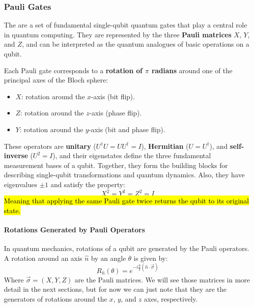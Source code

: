 \subsubsection{Pauli Gates}\label{sec:pauli-gates}

The  are a set of fundamental single-qubit quantum gates that play a central role in quantum computing. They are represented by the three \textbf{Pauli matrices} $X$, $Y$, and $Z$, and can be interpreted as the quantum analogues of basic operations on a qubit.

\highspace
Each Pauli gate corresponds to a \textbf{rotation of $\pi$ radians} around one of the principal axes of the Bloch sphere:
\begin{itemize}
    \item $X$: rotation around the $x$-axis (bit flip).
    \item $Z$: rotation around the $z$-axis (phase flip).
    \item $Y$: rotation around the $y$-axis (bit and phase flip).
\end{itemize}
These operators are \textbf{unitary} ($U^{\dagger} U = U U^{\dagger} = I$), \textbf{Hermitian} ($U = U^{\dagger}$), and \textbf{self-inverse} ($U^2 = I$), and their eigenstates define the three fundamental measurement bases of a qubit. Together, they form the building blocks for describing single-qubit transformations and quantum dynamics. Also, they have eigenvalues $\pm 1$ and satisfy the property:
\begin{equation*}
   X^{2} = Y^{2} = Z^{2} = I
\end{equation*}
\hl{Meaning that applying the same Pauli gate twice returns the qubit to its original state.}

\longline

\paragraph{Rotations Generated by Pauli Operators}

In quantum mechanics, rotations of a qubit are generated by the Pauli operators. A rotation around an axis $\hat{n}$ by an angle $\theta$ is given by:
\begin{equation}\label{eq:rotation-operator-general}
    R_{\hat{n}}(\theta) = e^{-i \frac{\theta}{2} (\hat{n} \cdot \vec{\sigma})}
\end{equation}
Where $\vec{\sigma} = (X, Y, Z)$ are the Pauli matrices. We will see those matrices in more detail in the next sections, but for now we can just note that they are the generators of rotations around the $x$, $y$, and $z$ axes, respectively.

